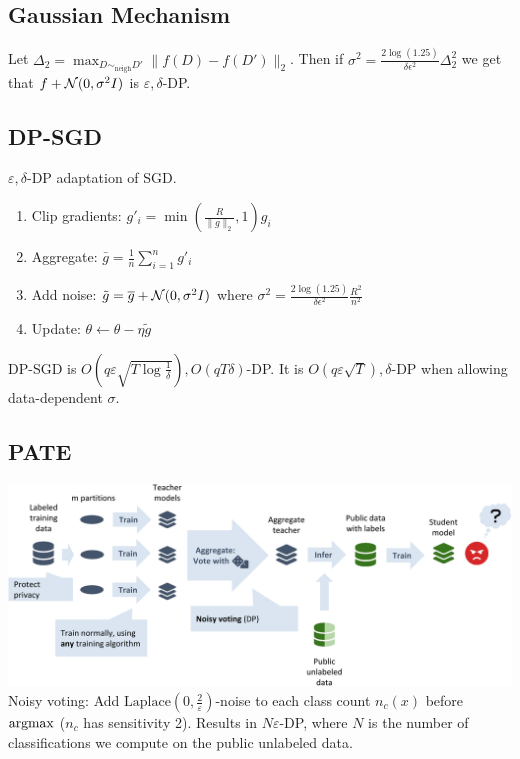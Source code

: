 \subsection*{Gaussian Mechanism}
Let $\Delta_2=\max_{D\sim_{\text{neigh}}D'}\|f(D)-f(D')\|_{{2}}$. Then if $\sigma^2=\frac{2\log(1.25)}{\delta\epsilon^2}\Delta_2^2$ we get that $f+\mathcal{N}(0,\sigma^2I)$ is $\varepsilon,\delta$-DP.
\subsection*{DP-SGD}
$\varepsilon,\delta$-DP adaptation of SGD.
\begin{enumerate}
    \item Clip gradients: ${g}'_i=\min\left(\frac{R}{\|{g}\|_2},1\right){g_i}$
    \item Aggregate: $\bar{g}=\frac{1}{n}\sum_{i=1}^n {g}'_i$
    \item Add noise: $\tilde{g}=\overline{g}+\mathcal{N}(0,\sigma^2I)$ where $\sigma^2=\frac{2\log(1.25)}{\delta \epsilon^2}\frac{R^2}{n^2}$
    \item Update: $\theta\leftarrow \theta-\eta\tilde{g}$
\end{enumerate}
DP-SGD is $O\left(q\varepsilon\sqrt{T\log{\frac{1}{\delta}}}\right),O(qT\delta)$-DP. It is $O(q\varepsilon\sqrt{T}),\delta$-DP when allowing data-dependent $\sigma$.

\subsection*{PATE}
\includegraphics[width=\columnwidth]{img/pate.png}
Noisy voting: Add $\text{Laplace}(0,\frac{2}{\varepsilon})$-noise to each class count $n_c(x)$ before $\operatorname{\operatorname{argmax}}$ ($n_c$ has sensitivity 2). Results in $N\varepsilon$-DP, where $N$ is the number of classifications we compute on the public unlabeled data.
